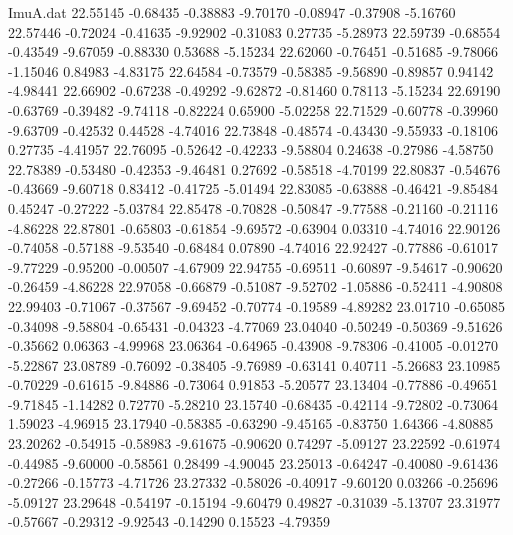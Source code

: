 \begin{filecontents}{ImuA.dat}
  22.55145   -0.68435   -0.38883   -9.70170   -0.08947   -0.37908   -5.16760
  22.57446   -0.72024   -0.41635   -9.92902   -0.31083    0.27735   -5.28973
  22.59739   -0.68554   -0.43549   -9.67059   -0.88330    0.53688   -5.15234
  22.62060   -0.76451   -0.51685   -9.78066   -1.15046    0.84983   -4.83175
  22.64584   -0.73579   -0.58385   -9.56890   -0.89857    0.94142   -4.98441
  22.66902   -0.67238   -0.49292   -9.62872   -0.81460    0.78113   -5.15234
  22.69190   -0.63769   -0.39482   -9.74118   -0.82224    0.65900   -5.02258
  22.71529   -0.60778   -0.39960   -9.63709   -0.42532    0.44528   -4.74016
  22.73848   -0.48574   -0.43430   -9.55933   -0.18106    0.27735   -4.41957
  22.76095   -0.52642   -0.42233   -9.58804    0.24638   -0.27986   -4.58750
  22.78389   -0.53480   -0.42353   -9.46481    0.27692   -0.58518   -4.70199
  22.80837   -0.54676   -0.43669   -9.60718    0.83412   -0.41725   -5.01494
  22.83085   -0.63888   -0.46421   -9.85484    0.45247   -0.27222   -5.03784
  22.85478   -0.70828   -0.50847   -9.77588   -0.21160   -0.21116   -4.86228
  22.87801   -0.65803   -0.61854   -9.69572   -0.63904    0.03310   -4.74016
  22.90126   -0.74058   -0.57188   -9.53540   -0.68484    0.07890   -4.74016
  22.92427   -0.77886   -0.61017   -9.77229   -0.95200   -0.00507   -4.67909
  22.94755   -0.69511   -0.60897   -9.54617   -0.90620   -0.26459   -4.86228
  22.97058   -0.66879   -0.51087   -9.52702   -1.05886   -0.52411   -4.90808
  22.99403   -0.71067   -0.37567   -9.69452   -0.70774   -0.19589   -4.89282
  23.01710   -0.65085   -0.34098   -9.58804   -0.65431   -0.04323   -4.77069
  23.04040   -0.50249   -0.50369   -9.51626   -0.35662    0.06363   -4.99968
  23.06364   -0.64965   -0.43908   -9.78306   -0.41005   -0.01270   -5.22867
  23.08789   -0.76092   -0.38405   -9.76989   -0.63141    0.40711   -5.26683
  23.10985   -0.70229   -0.61615   -9.84886   -0.73064    0.91853   -5.20577
  23.13404   -0.77886   -0.49651   -9.71845   -1.14282    0.72770   -5.28210
  23.15740   -0.68435   -0.42114   -9.72802   -0.73064    1.59023   -4.96915
  23.17940   -0.58385   -0.63290   -9.45165   -0.83750    1.64366   -4.80885
  23.20262   -0.54915   -0.58983   -9.61675   -0.90620    0.74297   -5.09127
  23.22592   -0.61974   -0.44985   -9.60000   -0.58561    0.28499   -4.90045
  23.25013   -0.64247   -0.40080   -9.61436   -0.27266   -0.15773   -4.71726
  23.27332   -0.58026   -0.40917   -9.60120    0.03266   -0.25696   -5.09127
  23.29648   -0.54197   -0.15194   -9.60479    0.49827   -0.31039   -5.13707
  23.31977   -0.57667   -0.29312   -9.92543   -0.14290    0.15523   -4.79359

\end{filecontents}
